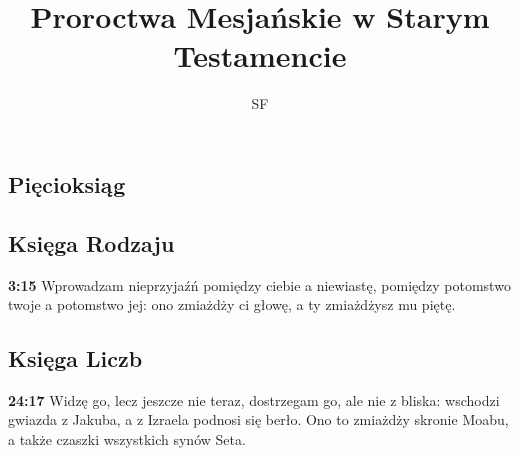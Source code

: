\documentclass[a4paper,11pt]{article}
\title{Proroctwa Mesjańskie w Starym Testamencie}
\author{SF}
\newcommand{\paddr}[1]{\textbf{#1}}
\begin{document}
\begin{fussy}

\maketitle
\tableofcontents

\section{Pięcioksiąg}

\subsection{Księga Rodzaju}

\paddr{3:15} Wprowadzam nieprzyjaźń pomiędzy ciebie a niewiastę, pomiędzy potomstwo twoje a potomstwo jej: ono zmiażdży ci głowę, a ty zmiażdżysz mu piętę.

\subsection{Księga Liczb}

\paddr{24:17} Widzę go, lecz jeszcze nie teraz, dostrzegam go, ale nie z bliska: wschodzi gwiazda z Jakuba, a z Izraela podnosi się berło. Ono to zmiażdży skronie Moabu, a także czaszki wszystkich synów Seta.

\end{fussy}
\end{document}
